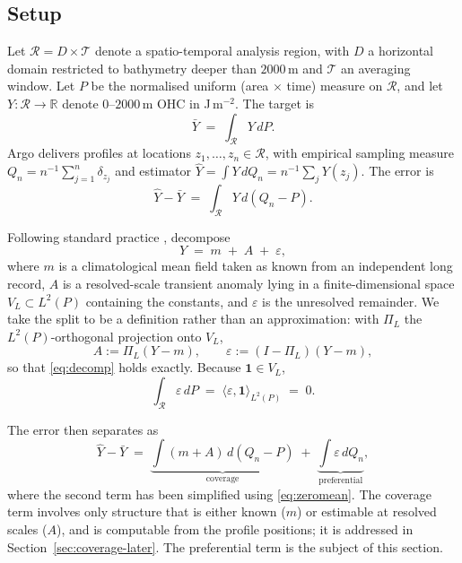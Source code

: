 \subsection{Setup}
\label{sec:setup}

Let $\mathcal{R} = D \times \mathcal{T}$ denote a spatio-temporal analysis region, with $D$ a
horizontal domain restricted to bathymetry deeper than $2000$\,m and $\mathcal{T}$ an
averaging window. Let $P$ be the normalised uniform (area $\times$ time) measure on
$\mathcal{R}$, and let $Y : \mathcal{R} \to \mathbb{R}$ denote $0$--$2000$\,m OHC in
J\,m$^{-2}$. The target is
\begin{equation}
  \bar{Y} \;=\; \int_{\mathcal{R}} Y \, dP .
\end{equation}
Argo delivers profiles at locations $z_1, \dots, z_n \in \mathcal{R}$, with empirical sampling
measure $Q_n = n^{-1}\sum_{j=1}^{n} \delta_{z_j}$ and estimator
$\hat{Y} = \int Y \, dQ_n = n^{-1}\sum_j Y(z_j)$. The error is
\begin{equation}
  \hat{Y} - \bar{Y} \;=\; \int_{\mathcal{R}} Y \, d(Q_n - P).
\end{equation}

Following standard practice \citep{roemmich2009, cressie2011}, decompose
\begin{equation}
  \label{eq:decomp}
  Y \;=\; m \;+\; A \;+\; \varepsilon ,
\end{equation}
where $m$ is a climatological mean field taken as known from an independent long record, $A$
is a resolved-scale transient anomaly lying in a finite-dimensional space
$V_L \subset L^2(P)$ containing the constants, and $\varepsilon$ is the unresolved remainder.
We take the split to be a definition rather than an approximation: with $\Pi_L$ the
$L^2(P)$-orthogonal projection onto $V_L$,
\begin{equation}
  A := \Pi_L (Y - m), \qquad \varepsilon := (I - \Pi_L)(Y-m),
\end{equation}
so that \eqref{eq:decomp} holds exactly. Because $\mathbf{1} \in V_L$,
\begin{equation}
  \label{eq:zeromean}
  \int_{\mathcal{R}} \varepsilon \, dP \;=\; \langle \varepsilon, \mathbf{1}\rangle_{L^2(P)} \;=\; 0 .
\end{equation}

The error then separates as
\begin{equation}
  \label{eq:split}
  \hat{Y} - \bar{Y}
  \;=\; \underbrace{\int (m + A)\, d(Q_n - P)}_{\text{coverage}}
  \;+\; \underbrace{\int \varepsilon \, dQ_n}_{\text{preferential}},
\end{equation}
where the second term has been simplified using \eqref{eq:zeromean}. The coverage term
involves only structure that is either known ($m$) or estimable at resolved scales ($A$), and
is computable from the profile positions; it is addressed in Section~\ref{sec:coverage-later}.
The preferential term is the subject of this section.

